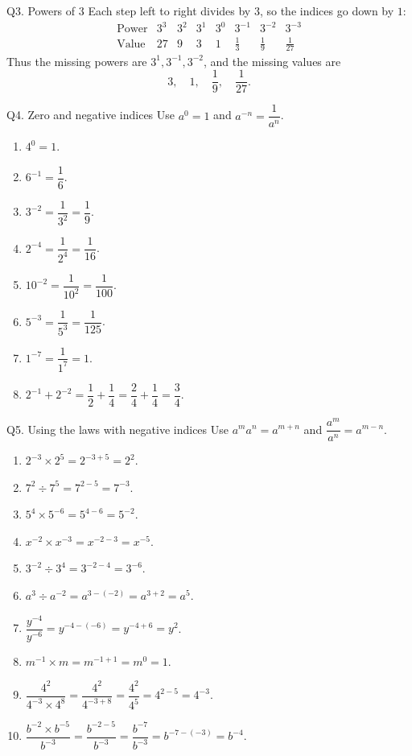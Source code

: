 \documentclass[12pt,a4paper]{article}
\begin{document}
\begin{solution}{Q3. Powers of \(3\)}
Each step left to right divides by \(3\), so the indices go down by \(1\):
\[
\begin{array}{c|ccccccc}
\text{Power}&3^3&3^2&3^1&3^0&3^{-1}&3^{-2}&3^{-3}\\[2pt]
\hline
\text{Value}&27&9&3&1&\frac13&\frac19&\frac1{27}
\end{array}
\]
Thus the missing powers are \(3^1,3^{-1},3^{-2}\), and the missing values are
\[
3,\quad 1,\quad \frac19,\quad \frac1{27}.
\]
\end{solution}

\begin{solution}{Q4. Zero and negative indices}
Use \(a^0=1\) and \(a^{-n}=\dfrac1{a^n}\).
\begin{enumerate}[label=\textbf{(\alph*)}]
\item \(4^0=1\).
\item \(6^{-1}=\dfrac16\).
\item \(3^{-2}=\dfrac1{3^2}=\dfrac19\).
\item \(2^{-4}=\dfrac1{2^4}=\dfrac1{16}\).
\item \(10^{-2}=\dfrac1{10^2}=\dfrac1{100}\).
\item \(5^{-3}=\dfrac1{5^3}=\dfrac1{125}\).
\item \(1^{-7}=\dfrac1{1^7}=1\).
\item \(2^{-1}+2^{-2}=\dfrac12+\dfrac14=\dfrac24+\dfrac14=\dfrac34\).
\end{enumerate}
\end{solution}

\begin{solution}{Q5. Using the laws with negative indices}
Use \(a^m a^n=a^{m+n}\) and \(\dfrac{a^m}{a^n}=a^{m-n}\).
\begin{enumerate}[label=\textbf{(\alph*)}]
\item \(2^{-3}\times2^5=2^{-3+5}=2^2\).
\item \(7^2\div7^5=7^{2-5}=7^{-3}\).
\item \(5^4\times5^{-6}=5^{4-6}=5^{-2}\).
\item \(x^{-2}\times x^{-3}=x^{-2-3}=x^{-5}\).
\item \(3^{-2}\div3^4=3^{-2-4}=3^{-6}\).
\item \(a^3\div a^{-2}=a^{3-(-2)}=a^{3+2}=a^5\).
\item \(\dfrac{y^{-4}}{y^{-6}}=y^{-4-(-6)}=y^{-4+6}=y^2\).
\item \(m^{-1}\times m=m^{-1+1}=m^0=1\).
\item \(\dfrac{4^2}{4^{-3}\times4^8}=\dfrac{4^2}{4^{-3+8}}=\dfrac{4^2}{4^5}=4^{2-5}=4^{-3}\).
\item \(\dfrac{b^{-2}\times b^{-5}}{b^{-3}}=\dfrac{b^{-2-5}}{b^{-3}}=\dfrac{b^{-7}}{b^{-3}}=b^{-7-(-3)}=b^{-4}\).
\end{enumerate}
\end{solution}
\end{document}
